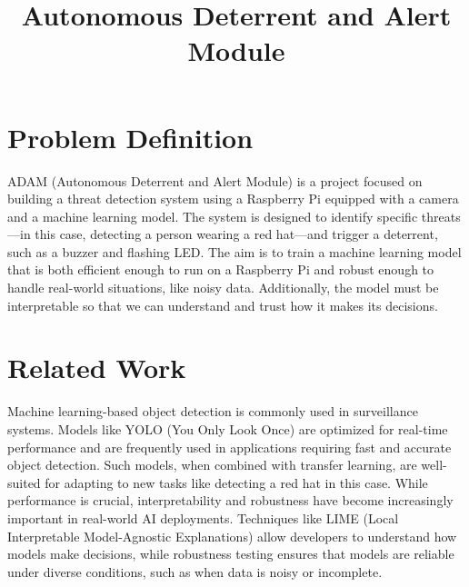 \documentclass{article}
\title{Autonomous Deterrent and Alert Module}
\begin{document}
\maketitle
\section{Problem Definition}
ADAM (Autonomous Deterrent and Alert Module) is a project focused on building a threat detection system using a Raspberry Pi equipped with a camera and a machine learning model. The system is designed to identify specific threats—in this case, detecting a person wearing a red hat—and trigger a deterrent, such as a buzzer and flashing LED. The aim is to train a machine learning model that is both efficient enough to run on a Raspberry Pi and robust enough to handle real-world situations, like noisy data. Additionally, the model must be interpretable so that we can understand and trust how it makes its decisions.


\section{Related Work}
Machine learning-based object detection is commonly used in surveillance systems. Models like YOLO (You Only Look Once) are optimized for real-time performance and are frequently used in applications requiring fast and accurate object detection. Such models, when combined with transfer learning, are well-suited for adapting to new tasks like detecting a red hat in this case. While performance is crucial, interpretability and robustness have become increasingly important in real-world AI deployments. Techniques like LIME (Local Interpretable Model-Agnostic Explanations) allow developers to understand how models make decisions, while robustness testing ensures that models are reliable under diverse conditions, such as when data is noisy or incomplete.
\end{document}
